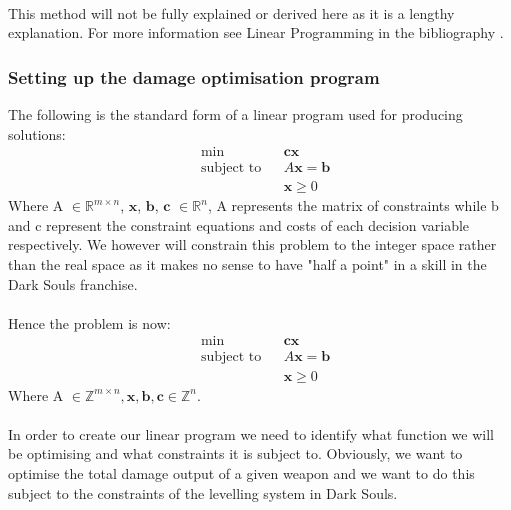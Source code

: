 \documentclass{article}
\begin{document}
\paragraph{}This method will not be fully explained or derived here as it is a lengthy explanation. For more information see Linear Programming in the bibliography \cite{linear-programming}.
\subsubsection{Setting up the damage optimisation program}
The following is the standard form of a linear program used for producing solutions:
\begin{equation*}
\begin{aligned}
    &\min & & \boldsymbol{cx} \\
    &\text{subject to} & & A\boldsymbol{x}=\boldsymbol{b}\\
    & & &\boldsymbol{x} \geq 0
\end{aligned}
\end{equation*}
Where A $\in \mathbb{R}^{m \times n}$, $\boldsymbol{x}$, $\boldsymbol{b}$, $\boldsymbol{c}$ $\in \mathbb{R}^n$, A represents the matrix of constraints while b and c represent the constraint equations and costs of each decision variable respectively. We however will constrain this problem to the integer space rather than the real space as it makes no sense to have "half a point" in a skill in the Dark Souls franchise.
\paragraph{}Hence the problem is now:
\begin{equation*}
\begin{aligned}
    &\min & & \boldsymbol{cx} \\
    &\text{subject to} & & A\boldsymbol{x}=\boldsymbol{b}\\
    & & &\boldsymbol{x} \geq 0
\end{aligned}
\end{equation*}
Where A $\in \mathbb{Z}^{m \times n}, \boldsymbol{x}, \boldsymbol{b}, \boldsymbol{c} \in \mathbb{Z}^n$.
\paragraph{}In order to create our linear program we need to identify what function we will be optimising and what constraints it is subject to. Obviously, we want to optimise the total damage output of a given weapon and we want to do this subject to the constraints of the levelling system in Dark Souls.
\end{document}

